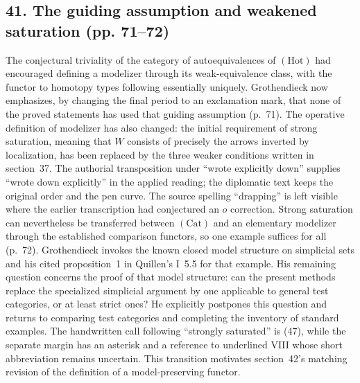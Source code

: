 \documentclass[10pt,oneside]{book}
\begin{document}
\subsection*{41. The guiding assumption and weakened saturation (pp. 71--72)}
The conjectural triviality of the category of autoequivalences of $(\mathrm{Hot})$ had encouraged defining a modelizer through its weak-equivalence class, with the functor to homotopy types following essentially uniquely. Grothendieck now emphasizes, by changing the final period to an exclamation mark, that none of the proved statements has used that guiding assumption (p.~71). The operative definition of modelizer has also changed: the initial requirement of strong saturation, meaning that $W$ consists of precisely the arrows inverted by localization, has been replaced by the three weaker conditions written in section~37. The authorial transposition under ``wrote explicitly down'' supplies ``wrote down explicitly'' in the applied reading; the diplomatic text keeps the original order and the pen curve. The source spelling ``drapping'' is left visible where the earlier transcription had conjectured an $o$ correction. Strong saturation can nevertheless be transferred between $(\mathrm{Cat})$ and an elementary modelizer through the established comparison functors, so one example suffices for all (p.~72). Grothendieck invokes the known closed model structure on simplicial sets and his cited proposition~1 in Quillen's I~5.5 for that example. His remaining question concerns the proof of that model structure: can the present methods replace the specialized simplicial argument by one applicable to general test categories, or at least strict ones? He explicitly postpones this question and returns to comparing test categories and completing the inventory of standard examples. The handwritten call following ``strongly saturated'' is (47), while the separate margin has an asterisk and a reference to underlined VIII whose short abbreviation remains uncertain. This transition motivates section~42's matching revision of the definition of a model-preserving functor.
\end{document}
